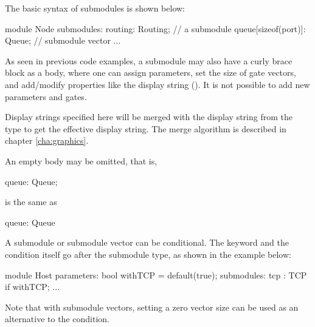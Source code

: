 The basic syntax of submodules is shown below:

\begin{ned}
module Node
{
    submodules:
        routing: Routing;   // a submodule
        queue[sizeof(port)]: Queue;  // submodule vector
        ...
}
\end{ned}

As seen in previous code examples, a submodule may also have a
curly brace block as a body, where one can assign parameters, set the size of
gate vectors, and add/modify properties like the display string
(). It is not possible to add new parameters and gates.

Display strings specified here will be merged with the display string
from the type to get the effective display string. The merge algorithm is
described in chapter \ref{cha:graphics}.


An empty body may be omitted, that is,

\begin{ned}
      queue: Queue;
\end{ned}

is the same as

\begin{ned}
      queue: Queue {
      }
\end{ned}

A submodule or submodule vector can be conditional. The 
keyword and the condition itself go after the submodule type, as shown in the
example below:

\begin{ned}
module Host
{
    parameters:
        bool withTCP = default(true);
    submodules:
        tcp : TCP if withTCP;
        ...
}
\end{ned}

Note that with submodule vectors, setting a zero vector size can be used as an
alternative to the  condition.

